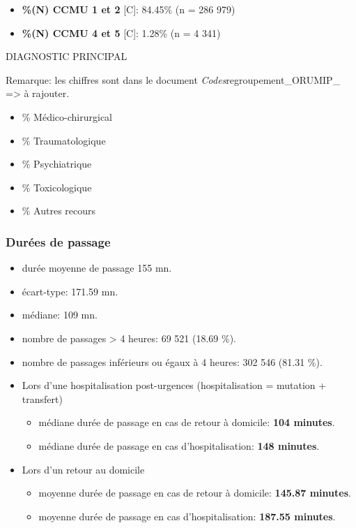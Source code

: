 \documentclass[]{article}
\begin{document}
\begin{itemize}
\itemsep1pt\parskip0pt
\item
  \textbf{\%(N) CCMU 1 et 2} {[}C{]}: 84.45\% (n = 286 979)
\item
  \textbf{\%(N) CCMU 4 et 5} {[}C{]}: 1.28\% (n = 4 341)
\end{itemize}

DIAGNOSTIC PRINCIPAL

Remarque: les chiffres sont dans le document
\emph{Codes}regroupement\_ORUMIP\_ =\textgreater{} à rajouter.

\begin{itemize}
\itemsep1pt\parskip0pt
\item
  \% Médico-chirurgical
\item
  \% Traumatologique
\item
  \% Psychiatrique
\item
  \% Toxicologique
\item
  \% Autres recours
\end{itemize}

\subsubsection{Durées de passage}\label{durees-de-passage}

\begin{itemize}
\item
  durée moyenne de passage 155 mn.
\item
  écart-type: 171.59 mn.
\item
  médiane: 109 mn.
\item
  nombre de passages \textgreater{} 4 heures: 69 521 (18.69 \%).
\item
  nombre de passages inférieurs ou égaux à 4 heures: 302 546 (81.31 \%).
\item
  Lors d'une hospitalisation post-urgences (hospitalisation = mutation +
  transfert)

  \begin{itemize}
  \itemsep1pt\parskip0pt
  \item
    médiane durée de passage en cas de retour à domicile: \textbf{104
    minutes}.
  \item
    médiane durée de passage en cas d'hospitalisation: \textbf{148
    minutes}.
  \end{itemize}
\item
  Lors d'un retour au domicile

  \begin{itemize}
  \itemsep1pt\parskip0pt
  \item
    moyenne durée de passage en cas de retour à domicile: \textbf{145.87
    minutes}.
  \item
    moyenne durée de passage en cas d'hospitalisation: \textbf{187.55
    minutes}.
  \end{itemize}
\end{itemize}
\end{document}
